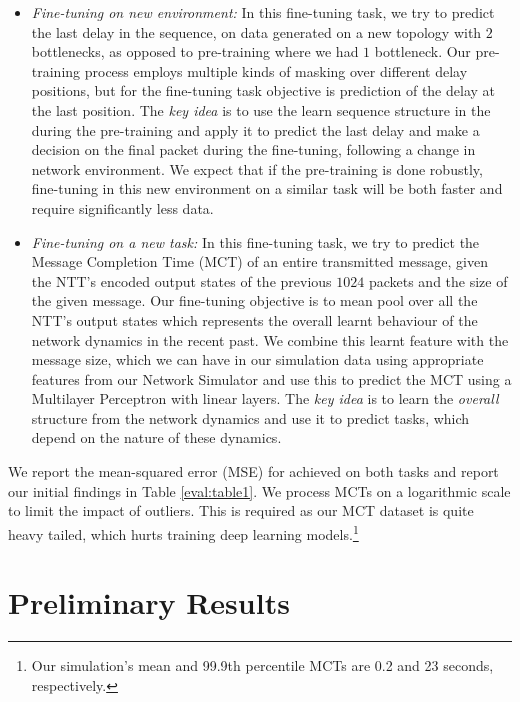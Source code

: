 \begin{itemize}
\item \emph{Fine-tuning on new environment:} In this fine-tuning task, we try to predict the last delay in the sequence, on data generated on a new topology with $2$ bottlenecks, as opposed to pre-training where we had $1$ bottleneck. Our pre-training process employs multiple kinds of masking over different delay positions, but for the fine-tuning task objective is prediction of the delay at the last position. The \emph{key idea} is to use the learn sequence structure in the during the pre-training and apply it to predict the last delay and make a decision on the final packet during the fine-tuning, following a change in network environment. We expect that if the pre-training is done robustly, fine-tuning in this new environment on a similar task will be both faster and require significantly less data.

\item \emph{Fine-tuning on a new task:} In this fine-tuning task, we try to predict the Message Completion Time (MCT) of an entire transmitted message, given the NTT's encoded output states of the previous $1024$ packets and the size of the given message. Our fine-tuning objective is to mean pool\cite{poolcv}\cite{zaheerDeepSets2018} over all the NTT's output states which represents the overall learnt behaviour of the network dynamics in the recent past. We combine this learnt feature with the message size, which we can have in our simulation data using appropriate features from our Network Simulator\cite{ns3} and use this to predict the MCT using a Multilayer Perceptron with linear layers. The \emph{key idea} is to learn the \emph{overall} structure from the network dynamics and use it to predict tasks, which depend on the nature of these dynamics.
\end{itemize}

We report the mean-squared error (MSE) for achieved on both tasks and report our initial findings in Table \ref{eval:table1}.
We process MCTs on a logarithmic scale to limit the impact of outliers. This is required as our MCT dataset is quite heavy tailed, which hurts training deep learning models.\footnote{Our simulation's mean and 99.9th percentile MCTs are 0.2 and 23 seconds, respectively.}


\section{Preliminary Results}
\label{eval:pres}

